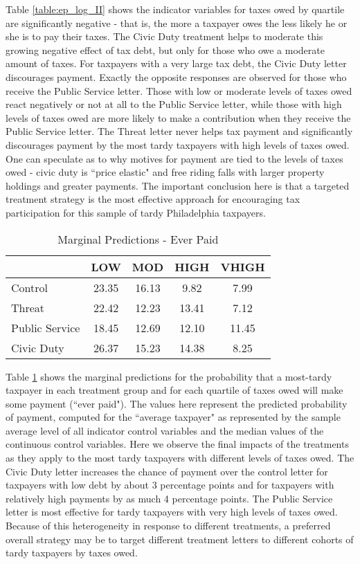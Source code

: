 \documentclass[12pt,titlepage]{article}
\begin{document}
Table \ref{table:ep_log_II} shows the indicator variables for taxes owed by
quartile are significantly negative - that is, the more a taxpayer
owes the less likely he or she is to pay their taxes.  The Civic Duty
treatment helps to moderate this growing negative effect of tax debt,
but only for those who owe a moderate amount of taxes.  For taxpayers
with a very large tax debt, the Civic Duty letter discourages payment.
Exactly the opposite responses are observed for those who receive the
Public Service letter.  Those with low or moderate levels of taxes
owed react negatively or not at all to the Public Service letter,
while those with high levels of taxes owed are more likely to make a
contribution when they receive the Public Service letter.  The Threat
letter never helps tax payment and significantly discourages payment
by the most tardy taxpayers with high levels of taxes owed.  One can
speculate as to why motives for payment are tied to the levels of
taxes owed - civic duty is ``price elastic" and free riding falls with
larger property holdings and greater payments. The important
conclusion here is that a targeted treatment strategy is the most
effective approach for encouraging tax participation for this sample
of tardy Philadelphia taxpayers.


\begin{table}[htbp]
\centering
\begin{tabular}{|l|c|c|c|c|}
  \hline
 & LOW & MOD & HIGH & VHIGH \\ 
  \hline
Control & 23.35 & 16.13 & 9.82 & 7.99 \\ 
  Threat & 22.42 & 12.23 & 13.41 & 7.12 \\ 
  Public Service & 18.45 & 12.69 & 12.10 & 11.45 \\ 
  Civic Duty & 26.37 & 15.23 & 14.38 & 8.25 \\ 
   \hline
\end{tabular}
\caption{Marginal Predictions - Ever Paid} 
\label{table:modelI_marg}
\end{table}


Table \ref{table:modelI_marg} shows the marginal predictions for the probability that
a most-tardy taxpayer in each treatment group and for each quartile of
taxes owed will make some payment (``ever paid").  The values here
represent the predicted probability of payment, computed for the
``average taxpayer" as represented by the sample average level of all
indicator control variables and the median values of the continuous
control variables.  Here we observe the final impacts of the
treatments as they apply to the most tardy taxpayers with different
levels of taxes owed.  The Civic Duty letter increases the chance of
payment over the control letter for taxpayers with low debt by about 3
percentage points and for taxpayers with relatively high payments by
as much 4 percentage points.  The Public Service letter is most
effective for tardy taxpayers with very high levels of taxes owed.
Because of this heterogeneity in response to different treatments, a
preferred overall strategy may be to target different treatment
letters to different cohorts of tardy taxpayers by taxes owed.
\end{document}
